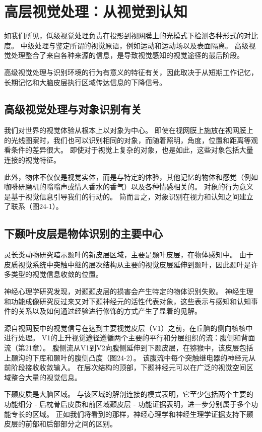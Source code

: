 \chapter{高层视觉处理：从视觉到认知}
如我们所见，低级视觉处理负责在投影到视网膜上的光模式下检测各种形式的对比度。 中级处理与鉴定所谓的视觉原语，例如运动和运动场以及表面隔离。 高级视觉处理整合了来自各种来源的信息，是导致视觉感知的视觉途径的最后阶段。

高级视觉处理与识别环境的行为有意义的特征有关，因此取决于从短期工作记忆，长期记忆和大脑皮层执行区域传达信息的下降信号。

\section{高级视觉处理与对象识别有关}
我们对世界的视觉体验从根本上以对象为中心。 即使在视网膜上施放在视网膜上的光线图案时，我们也可以识别相同的对象，而随着照明，角度，位置和距离等观看条件的差异很大。 即使对于视觉上复杂的对象，也是如此，这些对象包括大量连接的视觉特征。

此外，物体不仅仅是视觉实体，而是与特定的体验，其他记忆的物体和感觉（例如咖啡研磨机的嗡嗡声或情人香水的香气）以及各种情感相关的。 对象的行为意义是基于视觉信息引导我们的行动的。 简而言之，对象识别在视力和认知之间建立了联系（图24-1）。


\section{下颞叶皮层是物体识别的主要中心}

灵长类动物研究暗示颞叶的新皮层区域，主要是颞叶皮层，在物体感知中。 由于皮质视觉系统中突触中继的层次结构从主要的视觉皮层延伸到颞叶，因此颞叶是许多类型的视觉信息收敛的位置。

神经心理学研究发现，对颞颞皮层的损害会产生特定的物体识别失败。 神经生理和功能成像研究反过来又对下颞神经元的活性代表对象，这些表示与感知和认知事件的关系以及如何通过经验进行修饰的方式产生了显着的见解。

源自视网膜中的视觉信号在达到主要视觉皮层（V1）之前，在丘脑的侧向核核中进行处理。 V1的上升视觉途径遵循两个主要的平行和分层组织的流：腹侧和背面流（第21章）。 腹侧流从V1到V2向腹侧延伸到下颞皮层，在猕猴中，该皮层包括上颞沟的下库和颞叶的腹侧凸度（图24-2）。 该腹流中每个突触继电器的神经元从前阶段接收收敛输入。 在层次结构的顶部，下颞神经元可以在广泛的视觉空间区域整合大量的视觉信息。

下颞皮质是大脑区域。 与该区域的解剖连接的模式表明，它至少包括两个主要的功能细分 - 后枕骨后皮质和前区域颞皮层 - 功能证据表明，进一步分别属于多个功能专长的区域。 正如我们将看到的那样，神经心理学和神经生理学证据支持下颞皮层的前部和后部部分之间的区别。

